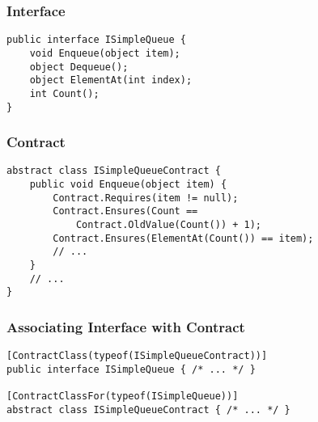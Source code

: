 \begin{frame}[fragile]
    \frametitle{Interface}

    \begin{verbatim}
public interface ISimpleQueue {
    void Enqueue(object item);
    object Dequeue();
    object ElementAt(int index);
    int Count();
}
    \end{verbatim}
\end{frame}

\begin{frame}[fragile]
    \frametitle{Contract}

    \begin{verbatim}
abstract class ISimpleQueueContract {
    public void Enqueue(object item) {
        Contract.Requires(item != null);
        Contract.Ensures(Count ==
            Contract.OldValue(Count()) + 1);
        Contract.Ensures(ElementAt(Count()) == item);
        // ...
    }
    // ...
}
    \end{verbatim}
\end{frame}

\begin{frame}[fragile]
    \frametitle{Associating Interface with Contract}

    \begin{verbatim}
[ContractClass(typeof(ISimpleQueueContract))]
public interface ISimpleQueue { /* ... */ }

[ContractClassFor(typeof(ISimpleQueue))]
abstract class ISimpleQueueContract { /* ... */ }
    \end{verbatim}
\end{frame}
